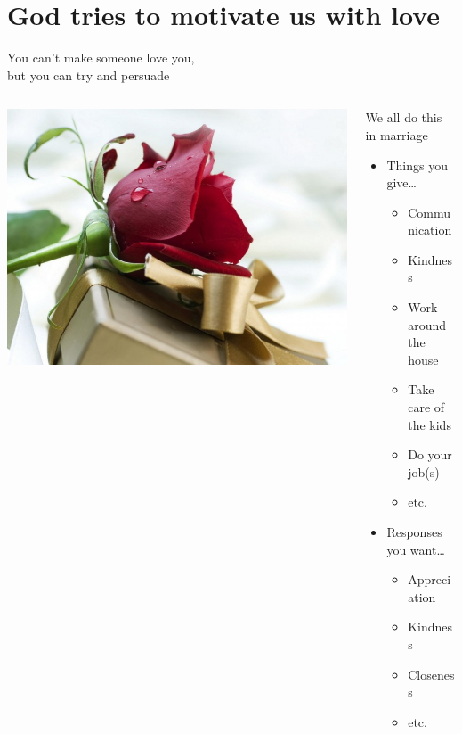\section{God tries to motivate us with love}

\begin{frame}{You can't make someone love you,\\but you can try and persuade}
\begin{columns}[c]
\begin{column}{0.5\textwidth}
	\includegraphics[width=\columnwidth]{figures/rose.jpg}
\end{column}
\begin{column}{0.5\textwidth}
	We all do this in marriage
	\begin{itemize}
    \item Things you give\ldots
		\begin{itemize}
			\item Communication
			\item Kindness
			\item Work around the house
      \item Take care of the kids
			\item Do your job(s)
			\item etc.
		\end{itemize}
    \item Responses you want\ldots
		\begin{itemize}
      \item Appreciation
      \item Kindness
      \item Closeness
			\item etc.
		\end{itemize}
	\end{itemize}
\end{column}
\end{columns}


\end{frame}
